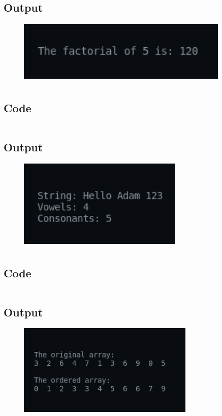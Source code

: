 \documentclass[12pt]{article}
\begin{document}
\subsection{Output}
\begin{figure}[h]
    \centering
    \includegraphics[width=0.9\textwidth]{4.png}
\end{figure}

\newpage
\section{}
\subsection{Code}
\inputminted{c}{q5.c}
\subsection{Output}
\begin{figure}[h]
    \centering
    \includegraphics[width=0.7\textwidth]{5.png}
\end{figure}

\newpage
\section{}
\subsection{Code}
\inputminted{c}{q6.c}
\newpage
\subsection{Output}
\begin{figure}[h]
    \centering
    \includegraphics[width=0.75\textwidth]{6.png}
\end{figure}
\end{document}
